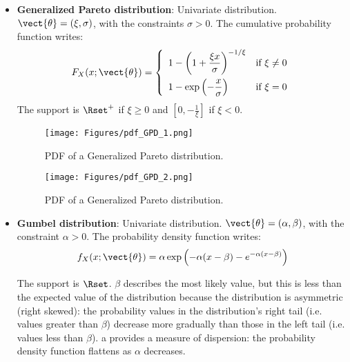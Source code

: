 {\begin{itemize}
\begin{figure}[H]
\begin{center}
\texttt{[image: Figures/pdf\_Gamma\_3.png]}
\caption{PDF of a Gamma distribution.}
\end{center}
\end{figure}



\item {\bf Generalized Pareto distribution}: Univariate
distribution. $\vect{\theta} = \left( \xi, \sigma \right)$, with the constraints  $\sigma>0$. The cumulative probability function writes:
\begin{equation}
F_X(x;\vect{\theta}) = \left\{
\begin{array}{ll}
\displaystyle 1-\left(
1+\frac{\xi x}{\sigma}\right)_{\strut}^{-1/\xi} & \mbox{if } \xi \neq 0 \\
\displaystyle 1-\exp\left(-\frac{x}{\sigma}\right) & \mbox{if } \xi = 0
\end{array}
\right.
\end{equation}
The support is $\Rset^+$ if $\xi \geq 0$ and $[0, -\frac{1}{\xi}]$ if $\xi < 0$.

\begin{figure}[H]
\begin{minipage}{8cm}
\begin{center}
\texttt{[image: Figures/pdf\_GPD\_1.png]}
\caption{PDF of a Generalized Pareto distribution.}
\end{center}
\end{minipage}
\hfill
\begin{minipage}{8cm}
\begin{center}
\texttt{[image: Figures/pdf\_GPD\_2.png]}
\caption{PDF of a Generalized Pareto distribution.}
\end{center}
\end{minipage}
\end{figure}


\item {\bf Gumbel distribution}: Univariate distribution. $\vect{\theta} = \left( \alpha,\beta \right)$, with the constraint $\alpha>0$. The probability density function writes:
\begin{equation}
f_X(x;\vect{\theta}) = \alpha \exp \left( -\alpha(x-\beta) - e^{-\alpha(x-\beta)} \right)
\end{equation}

The support is $\Rset$. $\beta$ describes the most likely value, but this is less than the expected value of the distribution because the distribution is asymmetric (right skewed): the probability values in the distribution's right tail (i.e. values greater than $\beta$) decrease more gradually than those in the left tail (i.e. values less than $\beta$). a provides a measure of dispersion: the probability density function flattens as $\alpha$ decreases.


\end{itemize}}

